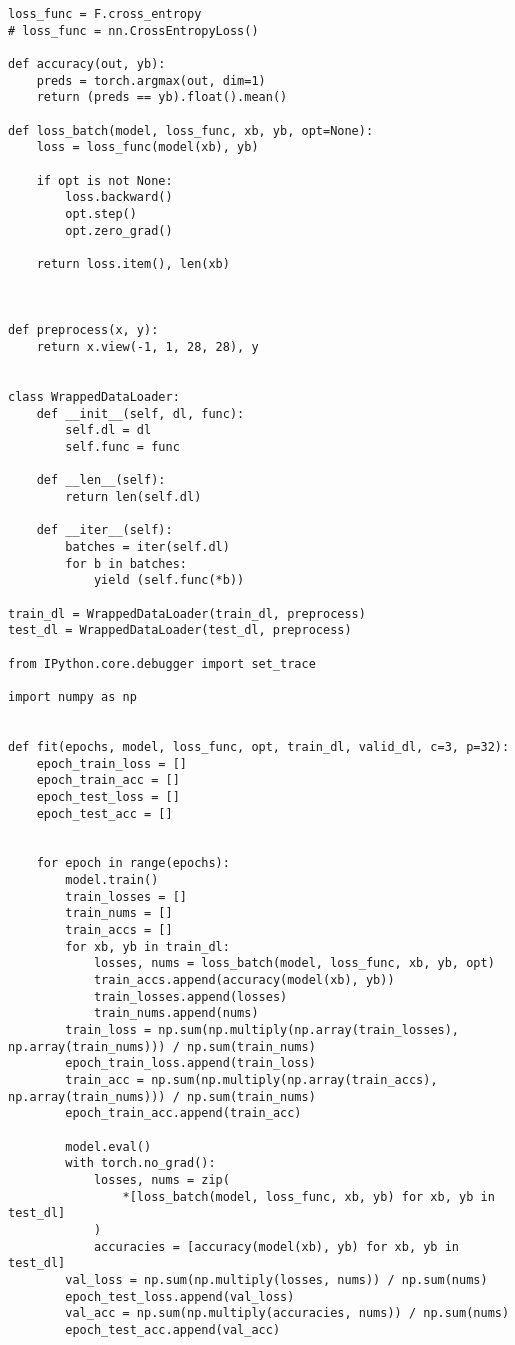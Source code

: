 \documentclass[12pt]{article}%
\begin{document}
\begin{lstlisting}
loss_func = F.cross_entropy
# loss_func = nn.CrossEntropyLoss()

def accuracy(out, yb):
    preds = torch.argmax(out, dim=1)
    return (preds == yb).float().mean()

def loss_batch(model, loss_func, xb, yb, opt=None):
    loss = loss_func(model(xb), yb)

    if opt is not None:
        loss.backward()
        opt.step()
        opt.zero_grad()

    return loss.item(), len(xb)



def preprocess(x, y):
    return x.view(-1, 1, 28, 28), y


class WrappedDataLoader:
    def __init__(self, dl, func):
        self.dl = dl
        self.func = func

    def __len__(self):
        return len(self.dl)

    def __iter__(self):
        batches = iter(self.dl)
        for b in batches:
            yield (self.func(*b))

train_dl = WrappedDataLoader(train_dl, preprocess)
test_dl = WrappedDataLoader(test_dl, preprocess)

from IPython.core.debugger import set_trace

import numpy as np


def fit(epochs, model, loss_func, opt, train_dl, valid_dl, c=3, p=32):
    epoch_train_loss = []
    epoch_train_acc = []
    epoch_test_loss = []
    epoch_test_acc = []
    

    for epoch in range(epochs):
        model.train()
        train_losses = []
        train_nums = []
        train_accs = []
        for xb, yb in train_dl:
            losses, nums = loss_batch(model, loss_func, xb, yb, opt)
            train_accs.append(accuracy(model(xb), yb))
            train_losses.append(losses)
            train_nums.append(nums)
        train_loss = np.sum(np.multiply(np.array(train_losses), np.array(train_nums))) / np.sum(train_nums)
        epoch_train_loss.append(train_loss)
        train_acc = np.sum(np.multiply(np.array(train_accs), np.array(train_nums))) / np.sum(train_nums)
        epoch_train_acc.append(train_acc)

        model.eval()
        with torch.no_grad():
            losses, nums = zip(
                *[loss_batch(model, loss_func, xb, yb) for xb, yb in test_dl]
            )
            accuracies = [accuracy(model(xb), yb) for xb, yb in test_dl]
        val_loss = np.sum(np.multiply(losses, nums)) / np.sum(nums)
        epoch_test_loss.append(val_loss)
        val_acc = np.sum(np.multiply(accuracies, nums)) / np.sum(nums)
        epoch_test_acc.append(val_acc)
        

\end{lstlisting}
\end{document}
